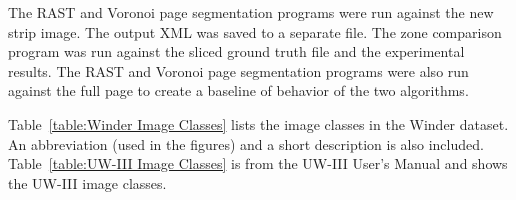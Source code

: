 \documentclass[conference]{IEEEtran}
\begin{document}
The RAST and Voronoi page segmentation programs were run against the new strip
image. The output XML was saved to a separate file. The zone comparison program
was run against the sliced ground truth file and the experimental results. The
RAST and Voronoi page segmentation programs were also run against the full page
to create a baseline of behavior of the two algorithms.  


%

Table~\ref{table:Winder Image Classes} lists the image classes in the Winder
dataset. An abbreviation (used in the figures) and a short description is also
included. Table~\ref{table:UW-III Image Classes} is from the UW-III User's
Manual and shows the UW-III image classes.
\end{document}
